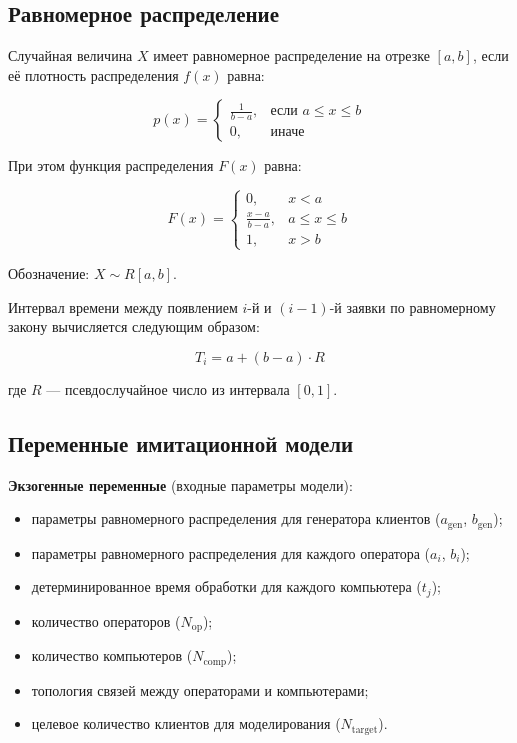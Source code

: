 \subsection{Равномерное распределение}

Случайная величина $X$ имеет равномерное распределение на отрезке $[a, b]$, если её плотность распределения $f(x)$ равна:

\begin{equation}
p(x) = \begin{cases}
\frac{1}{b-a}, & \text{если } a \leq x \leq b \\
0, & \text{иначе}
\end{cases}
\end{equation}

При этом функция распределения $F(x)$ равна:

\begin{equation}
F(x) = \begin{cases}
0, & x < a \\
\frac{x-a}{b-a}, & a \leq x \leq b \\
1, & x > b
\end{cases}
\end{equation}

Обозначение: $X \sim R[a, b]$.

Интервал времени между появлением $i$-й и $(i-1)$-й заявки по равномерному закону вычисляется следующим образом:

\begin{equation}
T_i = a + (b - a) \cdot R
\end{equation}

где $R$ — псевдослучайное число из интервала $[0, 1]$.

\subsection{Переменные имитационной модели}

\textbf{Экзогенные переменные} (входные параметры модели):

\begin{itemize}
    \item параметры равномерного распределения для генератора клиентов ($a_{\text{gen}}$, $b_{\text{gen}}$);
    \item параметры равномерного распределения для каждого оператора ($a_i$, $b_i$);
    \item детерминированное время обработки для каждого компьютера ($t_j$);
    \item количество операторов ($N_{\text{op}}$);
    \item количество компьютеров ($N_{\text{comp}}$);
    \item топология связей между операторами и компьютерами;
    \item целевое количество клиентов для моделирования ($N_{\text{target}}$).
\end{itemize}

